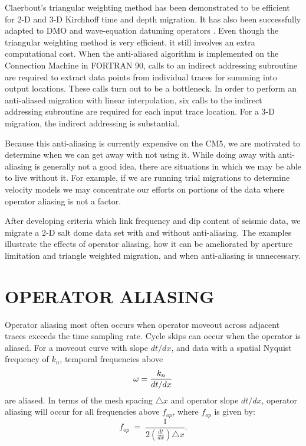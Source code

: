 Claerbout's triangular weighting method has been demonstrated to be
efficient for 2-D \cite[]{Bevc.sep.75.91,Bevc.sep.77.295} and 
3-D \cite[]{Lumley.sep.77.1,Lumley.sep.80.david2} 
Kirchhoff time and depth migration.  
It has also been successfully adapted to DMO and 
wave-equation datuming operators \cite[]{Blondel.sep.77.49,Bevc.sep75.137}.
Even though the triangular weighting method is very efficient, it 
still involves an extra computational cost.
When the anti-aliased algorithm is implemented on the
Connection Machine in FORTRAN 90,
calls to an indirect addressing subroutine are required to extract
data points from individual traces for summing into output locations.
These calls turn out to be a bottleneck.
In order to perform an anti-aliased migration with linear interpolation,
six calls to the indirect addressing subroutine are required for each
input trace location. For a 3-D migration, the indirect addressing
is substantial.

Because this anti-aliasing is currently expensive on the CM5,
we are motivated to
determine when we can get away with not using it. While doing away 
with anti-aliasing is generally not a good idea, there are situations in which
we may be able to live without it. For example, if we are running 
trial migrations to determine velocity models we may concentrate
our efforts on portions of the data where operator aliasing is not a
factor. 

After developing criteria which link frequency and dip content of seismic data,
we migrate a 2-D  salt dome data set with and without anti-aliasing.
The examples illustrate the effects of operator aliasing, how it can be 
ameliorated by aperture limitation and triangle weighted migration, and
when anti-aliasing is unnecessary.

\section{OPERATOR ALIASING}
Operator aliasing most often occurs when operator moveout across adjacent
traces exceeds the time sampling rate. Cycle skips can occur 
when the operator is
aliased.  For a moveout curve with slope $dt/dx$, and data with a spatial
Nyquist frequency of $k_n$, temporal frequencies above
$$
\omega = {k_n\over{dt/dx}}
$$
are aliased.
In terms of the mesh spacing $\triangle x$ and operator slope $dt/dx$,
operator aliasing will occur for all frequencies above $f_{op}$, where
$f_{op}$ is given by:
\begin{equation}
f_{op} \; = \; \frac{1}{2 (\frac{dt}{dx}) \triangle x}.
\end{equation}

